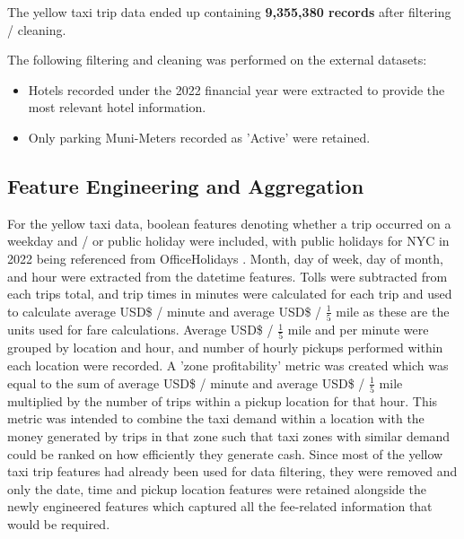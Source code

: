 \documentclass[11pt]{article}
\begin{document}
The yellow taxi trip data ended up containing \textbf{9,355,380 records} after filtering / cleaning.

The following filtering and cleaning was performed on the external datasets:

\begin{itemize} 
    \item Hotels recorded under the 2022 financial year were extracted to provide the most relevant hotel information.
    \item Only parking Muni-Meters recorded as 'Active' were retained.
\end{itemize} 

\subsection{Feature Engineering and Aggregation}
For the yellow taxi data, boolean features denoting whether a trip occurred on a weekday and / or public holiday were included, with public holidays for NYC in 2022 being referenced from OfficeHolidays \cite{holidays}. Month, day of week, day of month, and hour were extracted from the datetime features. Tolls were subtracted from each trips total, and trip times in minutes were calculated for each trip and used to calculate average USD\$ / minute and average  USD\$ / $\frac{1}{5}$ mile as these are the units used for fare calculations. Average USD\$ / $\frac{1}{5}$ mile and per minute were grouped by location and hour, and number of hourly pickups performed within each location were recorded. A 'zone profitability' metric was created which was equal to the sum of average USD\$ / minute and average USD\$ / $\frac{1}{5}$ mile multiplied by the number of trips within a pickup location for that hour. This metric was intended to combine the taxi demand within a location with the money generated by trips in that zone such that taxi zones with similar demand could be ranked on how efficiently they generate cash. Since most of the yellow taxi trip features had already been used for data filtering, they were removed and only the date, time and pickup location features were retained alongside the newly engineered features which captured all the fee-related information that would be required.
\end{document}
